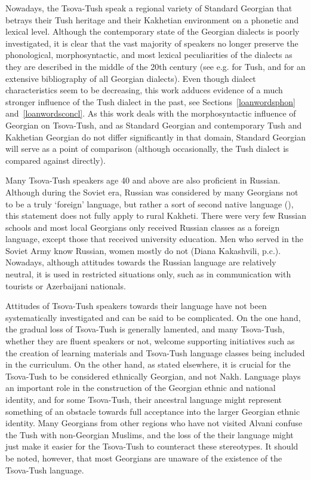 Nowadays, the Tsova-Tush speak a regional variety of Standard Georgian that betrays their Tush heritage and their Kakhetian environment on a phonetic and lexical level. Although the contemporary state of the Georgian dialects is poorly investigated, it is clear that the vast majority of speakers no longer preserve the phonological, morphosyntactic, and most lexical peculiarities of the dialects as they are described in the middle of the 20th century (see e.g. \textcite{khubutuia1969tushlexicon,shanidze1957mountaindialects,uturgaidze1966mountainous,uturgaidze60} for Tush, and \textcite{jorbenadze1989geodialect,kartulidialekt} for an extensive bibliography of all Georgian dialects). Even though dialect characteristics seem to be decreasing, this work adduces evidence of a much stronger influence of the Tush dialect in the past, see Sections~\ref{loanwordsphon} and~\ref{loanwordsconcl}. As this work deals with the morphosyntactic influence of Georgian on Tsova-Tush, and as Standard Georgian and contemporary Tush and Kakhetian Georgian do not differ significantly in that domain, Standard Georgian will serve as a point of comparison (although occasionally, the Tush dialect is compared against directly).


Many Tsova-Tush speakers age 40 and above are also proficient in Russian. Although during the Soviet era, Russian was considered by many Georgians not to be a truly ‘foreign’ language, but rather a sort of second native language (\cites[]{blauvelt2013russian}), this statement does not fully apply to rural Kakheti. There were very few Russian schools and most local Georgians only received Russian classes as a foreign language, except those that received university education. Men who served in the Soviet Army know Russian, women mostly do not (Diana Kakashvili, p.c.). Nowadays, although attitudes towards the Russian language are relatively neutral, it is used in restricted situations only, such as in communication with tourists or Azerbaijani nationals.

Attitudes of Tsova-Tush speakers towards their language have not been systematically investigated and can be said to be complicated. On the one hand, the gradual loss of Tsova-Tush is generally lamented, and many Tsova-Tush, whether they are fluent speakers or not, welcome supporting initiatives such as the creation of learning materials and Tsova-Tush language classes being included in the curriculum. On the other hand, as stated elsewhere, it is crucial for the Tsova-Tush to be considered ethnically Georgian, and not Nakh. Language plays an important role in the construction of the Georgian ethnic and national identity, and for some Tsova-Tush, their ancestral language might represent something of an obstacle towards full acceptance into the larger Georgian ethnic identity. Many Georgians from other regions who have not visited Alvani confuse the Tush with non-Georgian Muslims, and the loss of the their language might just make it easier for the Tsova-Tush to counteract these stereotypes. It should be noted, however, that most Georgians are unaware of the existence of the Tsova-Tush language.


